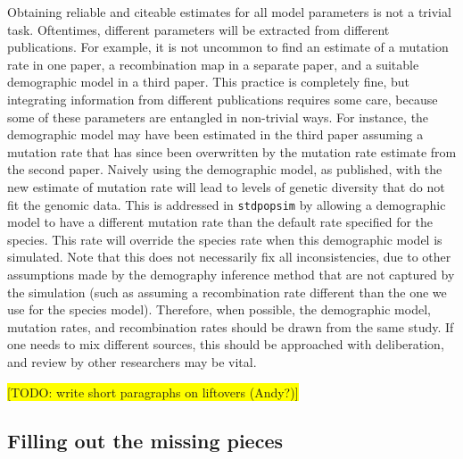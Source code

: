 \documentclass{article}
\newcommand{\stdpopsim}{\texttt{stdpopsim}\xspace}
\begin{document}
Obtaining reliable and citeable estimates for all model parameters is not a trivial task. Oftentimes, different parameters will be extracted from different publications. For example, it is not uncommon to find an estimate of a mutation rate in one paper, a recombination map in a separate paper, and a suitable demographic model in a third paper. This practice is completely fine, but integrating information from different publications requires some care, because some of these parameters are entangled in non-trivial ways.
For instance, the demographic model may have been estimated in the third paper assuming a mutation rate that has since been overwritten by the mutation rate estimate from the second paper. Naively using the demographic model, as published, with the new estimate of mutation rate will lead to levels of genetic diversity that do not fit the genomic data.
%
This is addressed in \texttt{\stdpopsim} by allowing a demographic model to have a different mutation rate than the default rate specified for the species. This rate will override the species rate when this demographic model is simulated.
%
Note that this does not necessarily fix all inconsistencies, due to other assumptions made by the demography inference method that are not captured by the simulation (such as assuming a recombination rate different than the one we use for the species model). Therefore, when possible, the demographic model, mutation rates, and recombination rates should
be drawn from the same study. If one needs to mix different sources, this should be approached with deliberation, and review by other researchers may be vital.


\colorbox{yellow}{[TODO: write short paragraphs on liftovers (Andy?)]}

\subsection*{Filling out the missing pieces}
\end{document}
